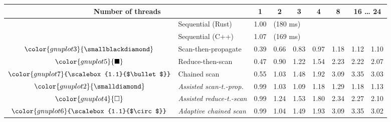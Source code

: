 \begin{tabular}{clrrrrrrr}
\toprule
\multicolumn{2}{c}{\textbf{Number of threads}} & \multicolumn{1}{c}{\textbf{ 1 }} & \multicolumn{1}{c}{\textbf{ 2 }} & \multicolumn{1}{c}{\textbf{ 3 }} & \multicolumn{1}{c}{\textbf{ 4 }} & \multicolumn{1}{c}{\textbf{ 8 }} & \multicolumn{2}{c}{\textbf{ 16 } \dots \textbf{ 24 }} \\
\midrule
& Sequential (Rust) & \multicolumn{1}{r}{ 1.00 } & \multicolumn{ 6 }{l}{(180 ms)} \\
& Sequential (C++) & \multicolumn{1}{r}{ 1.07 } & \multicolumn{ 6 }{l}{(169 ms)} \\
\rowcolor{gnuplot3!10}$\color{gnuplot3}{\smallblackdiamond}$ & Scan-then-propagate & \cellcolor{gnuplot3!10} 0.39 & \cellcolor{gnuplot3!10} 0.66 & \cellcolor{gnuplot3!10} 0.83 & \cellcolor{gnuplot3!10} 0.97 & \cellcolor{gnuplot3!10} 1.18 & \cellcolor{gnuplot3!10} 1.12 & \cellcolor{gnuplot3!10} 1.10 \\
\rowcolor{gnuplot5!10}$\color{gnuplot5}{\blacksquare}$ & Reduce-then-scan & \cellcolor{gnuplot5!10} 0.47 & \cellcolor{gnuplot5!10} 0.90 & \cellcolor{gnuplot5!10} 1.22 & \cellcolor{gnuplot5!10} 1.54 & \cellcolor{gnuplot5!10} 2.23 & \cellcolor{gnuplot5!10} 2.22 & \cellcolor{gnuplot5!10} 2.07 \\
\rowcolor{gnuplot7!10}$\color{gnuplot7}{\scalebox{1.1}{$\bullet$}}$ & Chained scan & \cellcolor{gnuplot7!10} 0.55 & \cellcolor{gnuplot7!10} 1.03 & \cellcolor{gnuplot7!10} 1.48 & \cellcolor{gnuplot7!10} 1.92 & \cellcolor{gnuplot7!10} 3.09 & \cellcolor{gnuplot7!10} 3.35 & \cellcolor{gnuplot7!10} 3.03 \\
\rowcolor{gnuplot2!30}$\color{gnuplot2}{\smalldiamond}$ & \textit{Assisted scan-t.-prop.} & \cellcolor{gnuplot2!30} 0.99 & \cellcolor{gnuplot2!30} 1.03 & \cellcolor{gnuplot2!30} 1.09 & \cellcolor{gnuplot2!30} 1.18 & \cellcolor{gnuplot2!30} 1.29 & \cellcolor{gnuplot2!30} 1.18 & \cellcolor{gnuplot2!30} 1.13 \\
\rowcolor{gnuplot4!30}$\color{gnuplot4}{\square}$ & \textit{Assisted reduce-t.-scan} & \cellcolor{gnuplot4!30} 0.99 & \cellcolor{gnuplot4!30} 1.24 & \cellcolor{gnuplot4!30} 1.53 & \cellcolor{gnuplot4!30} 1.80 & \cellcolor{gnuplot4!30} 2.34 & \cellcolor{gnuplot4!30} 2.27 & \cellcolor{gnuplot4!30} 2.10 \\
\rowcolor{gnuplot6!30}$\color{gnuplot6}{\scalebox{1.1}{$\circ$}}$ & \textit{Adaptive chained scan} & \cellcolor{gnuplot6!30} 0.99 & \cellcolor{gnuplot6!30} 1.04 & \cellcolor{gnuplot6!30} 1.49 & \cellcolor{gnuplot6!30} 1.93 & \cellcolor{gnuplot6!30} 3.09 & \cellcolor{gnuplot6!30} 3.35 & \cellcolor{gnuplot6!30} 3.02 \\

\end{tabular}
